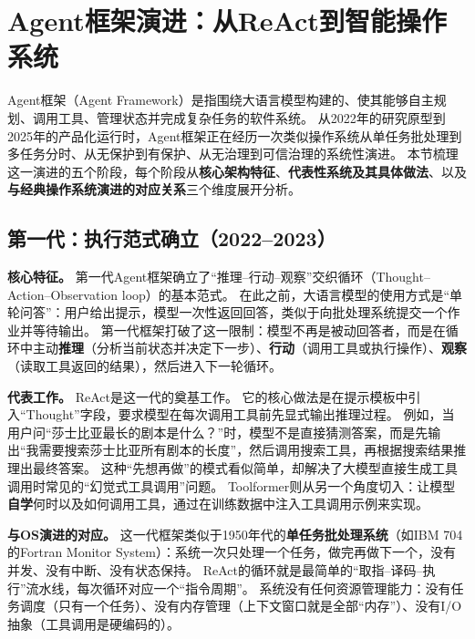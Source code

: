 \section{Agent框架演进：从ReAct到智能操作系统}
\label{sec:agentevolution}

Agent框架（Agent Framework）是指围绕大语言模型构建的、使其能够自主规划、调用工具、管理状态并完成复杂任务的软件系统。
从2022年的研究原型到2025年的产品化运行时，Agent框架正在经历一次类似操作系统从单任务批处理到多任务分时、从无保护到有保护、从无治理到可信治理的系统性演进。
本节梳理这一演进的五个阶段，每个阶段从\textbf{核心架构特征}、\textbf{代表性系统及其具体做法}、以及\textbf{与经典操作系统演进的对应关系}三个维度展开分析。

\subsection*{第一代：执行范式确立（2022--2023）}

\textbf{核心特征。}
第一代Agent框架确立了``推理--行动--观察''交织循环（Thought--Action--Observation loop）的基本范式。
在此之前，大语言模型的使用方式是``单轮问答''：用户给出提示，模型一次性返回回答，类似于向批处理系统提交一个作业并等待输出。
第一代框架打破了这一限制：模型不再是被动回答者，而是在循环中主动\textbf{推理}（分析当前状态并决定下一步）、\textbf{行动}（调用工具或执行操作）、\textbf{观察}（读取工具返回的结果），然后进入下一轮循环。

\textbf{代表工作。}
ReAct\cite{yao2023react}是这一代的奠基工作。
它的核心做法是在提示模板中引入``Thought''字段，要求模型在每次调用工具前先显式输出推理过程。
例如，当用户问``莎士比亚最长的剧本是什么？''时，模型不是直接猜测答案，而是先输出``我需要搜索莎士比亚所有剧本的长度''，然后调用搜索工具，再根据搜索结果推理出最终答案。
这种``先想再做''的模式看似简单，却解决了大模型直接生成工具调用时常见的``幻觉式工具调用''问题。
Toolformer\cite{schick2023toolformer}则从另一个角度切入：让模型\textbf{自学}何时以及如何调用工具，通过在训练数据中注入工具调用示例来实现。

\textbf{与OS演进的对应。}
这一代框架类似于1950年代的\textbf{单任务批处理系统}（如IBM 704的Fortran Monitor System）：系统一次只处理一个任务，做完再做下一个，没有并发、没有中断、没有状态保持。
ReAct的循环就是最简单的``取指--译码--执行''流水线，每次循环对应一个``指令周期''。
系统没有任何资源管理能力：没有任务调度（只有一个任务）、没有内存管理（上下文窗口就是全部``内存''）、没有I/O抽象（工具调用是硬编码的）。


